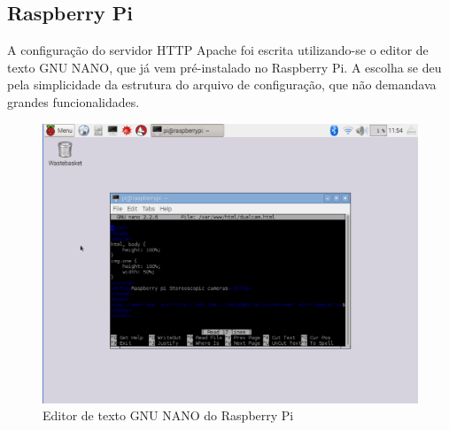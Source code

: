 		\subsection{Raspberry Pi}\label{subsec-raspIDE}
			A configuração do servidor HTTP Apache foi escrita utilizando-se o editor de texto GNU NANO, que já vem pré-instalado no Raspberry Pi. A escolha se deu pela simplicidade da estrutura do arquivo de configuração, que não demandava grandes funcionalidades.
			\begin{figure}[h!]
		\caption{\label{fig_raspIDE} Editor de texto GNU NANO do Raspberry Pi }
		\begin{center}
			\includegraphics[width=\textwidth]{raspIDE.png}	
		\end{center}
	\end{figure}

